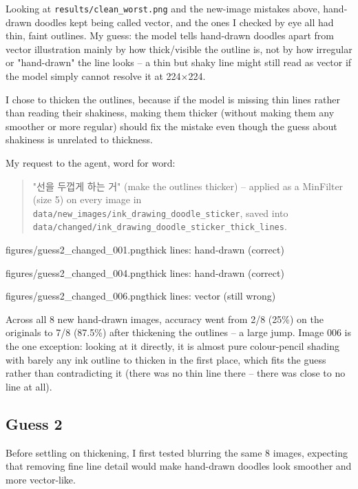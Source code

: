 \documentclass[11pt]{article}
\begin{document}
Looking at \texttt{results/clean\_worst.png} and the new-image mistakes above,
hand-drawn doodles kept being called vector, and the ones I checked by eye
all had thin, faint outlines. My guess: the model tells hand-drawn doodles
apart from vector illustration mainly by how thick/visible the outline is,
not by how irregular or "hand-drawn" the line looks -- a thin but shaky line
might still read as vector if the model simply cannot resolve it at
224$\times$224.

I chose to thicken the outlines, because if the model is missing thin lines
rather than reading their shakiness, making them thicker (without making them
any smoother or more regular) should fix the mistake even though the guess
about shakiness is unrelated to thickness.

My request to the agent, word for word:
\begin{quote}
"선을 두껍게 하는 거" (make the outlines thicker) -- applied as a MinFilter
(size 5) on every image in \texttt{data/new\_images/ink\_drawing\_doodle\_sticker},
saved into \texttt{data/changed/ink\_drawing\_doodle\_sticker\_thick\_lines}.
\end{quote}

           {figures/guess2_changed_001.png}{thick lines: hand-drawn (correct)}

           {figures/guess2_changed_004.png}{thick lines: hand-drawn (correct)}

           {figures/guess2_changed_006.png}{thick lines: vector (still wrong)}

Across all 8 new hand-drawn images, accuracy went from 2/8 (25\%) on the
originals to 7/8 (87.5\%) after thickening the outlines -- a large jump.
Image 006 is the one exception: looking at it directly, it is almost pure
colour-pencil shading with barely any ink outline to thicken in the first
place, which fits the guess rather than contradicting it (there was no thin
line there -- there was close to no line at all).

\subsection*{Guess 2}

Before settling on thickening, I first tested blurring the same 8 images,
expecting that removing fine line detail would make hand-drawn doodles look
smoother and more vector-like.
\end{document}
